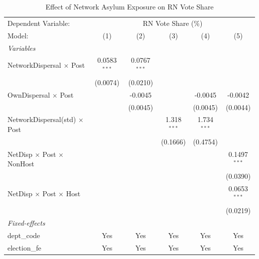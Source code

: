 
\begin{table}[htbp]
   \caption{\label{tab:main} Effect of Network Asylum Exposure on RN Vote Share}
   \centering
   \begin{tabular}{lccccc}
      \tabularnewline \midrule \midrule
      Dependent Variable: & \multicolumn{5}{c}{RN Vote Share (\%)}\\
      Model:                                   & (1)            & (2)            & (3)           & (4)           & (5)\\  
      \midrule
      \emph{Variables}\\
      NetworkDispersal $\times$ Post           & 0.0583$^{***}$ & 0.0767$^{***}$ &               &               &   \\   
                                               & (0.0074)       & (0.0210)       &               &               &   \\   
      OwnDispersal $\times$ Post               &                & -0.0045        &               & -0.0045       & -0.0042\\   
                                               &                & (0.0045)       &               & (0.0045)      & (0.0044)\\   
      NetworkDispersal(std) $\times$ Post      &                &                & 1.318$^{***}$ & 1.734$^{***}$ &   \\   
                                               &                &                & (0.1666)      & (0.4754)      &   \\   
      NetDisp $\times$ Post $\times$ NonHost   &                &                &               &               & 0.1497$^{***}$\\   
                                               &                &                &               &               & (0.0390)\\   
      NetDisp $\times$ Post $\times$ Host      &                &                &               &               & 0.0653$^{***}$\\   
                                               &                &                &               &               & (0.0219)\\   
      \midrule
      \emph{Fixed-effects}\\
      dept\_code                               & Yes            & Yes            & Yes           & Yes           & Yes\\  
      election\_fe                             & Yes            & Yes            & Yes           & Yes           & Yes\\  

\end{tabular}
\end{table}
